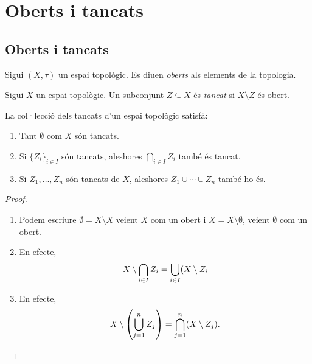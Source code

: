 \documentclass[../main.tex]{subfiles}
\begin{document}
\chapter{Oberts i tancats}






\section{Oberts i tancats}

\begin{defi}
[Obert]\label{def:obert} Sigui $(X,\tau)$ un espai topològic. Es diuen \textit{oberts} als elements de la topologia.
\end{defi}

\begin{defi}
[Tancat]\label{def:tancattopologia} Sigui $X$ un espai topològic. Un subconjunt $Z\subseteq X$ és \textit{tancat} si $X\setminus Z$ és obert.
\end{defi}

\begin{prop}
\label{prop:propietatstancatstopo} La col·lecció dels tancats d'un espai topològic satisfà:
\begin{enumerate}[(1)]
    \item Tant $\emptyset$ com $X$ són tancats.
    \item Si $\{Z_i\}_{i\in I}$ són tancats, aleshores $\bigcap_{i\in I}Z_i$ també és tancat.
    \item Si $Z_1,\ldots,Z_n$ són tancats de $X$, aleshores $Z_1\cup \cdots\cup Z_n$ també ho és.
\end{enumerate}
\end{prop}
\begin{proof}
\begin{enumerate}[(1)]
    \item Podem escriure $\emptyset = X\setminus X$ veient $X$ com un obert i $X = X\setminus \emptyset$, veient $\emptyset$ com un obert.
    \item En efecte,
    \begin{equation}
        \notag
        X\setminus\bigcap_{i\in I}Z_i = \bigcup_{i\in I}(X\setminus Z_i
    \end{equation}
    \item En efecte,
    \begin{equation}
        \notag
        X\setminus\left(\bigcup_{j=1}^nZ_j\right) = \bigcap_{j=1}^n(X\setminus Z_j).
    \end{equation}
\end{enumerate}
\end{proof}
\end{document}
